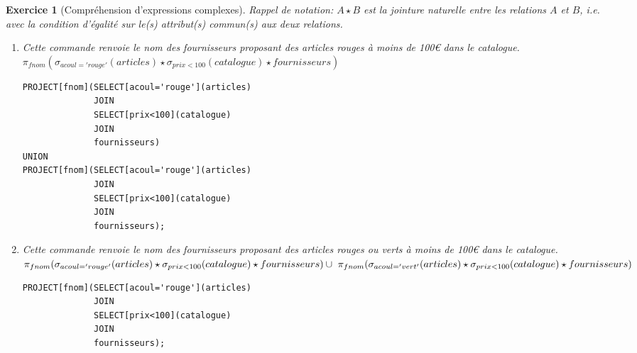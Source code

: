 \documentclass{article}
\theoremstyle{exostyle}
\newtheorem{exercice}{Exercice}
\newenvironment{questions}{

\begin{enumerate}[\hspace{12pt}\bfseries\itshape 1.]}{
\end{enumerate}

} %
\begin{document}
\begin{exercice}[Compréhension d'expressions complexes]
Rappel de notation: $A\star B$ est  la jointure naturelle entre les relations $A$ et $B$, \textit{i.e.} avec la condition d'égalité sur le(s) attribut(s) commun(s) aux deux relations.

\begin{questions}
\item Cette commande renvoie le nom des fournisseurs proposant des articles rouges à moins de 100\euro{} dans le catalogue.\\
$\pi_{fnom}(\sigma_{acoul='rouge'}(articles) \star \sigma_{prix<100}(catalogue) \star fournisseurs)$
\begin{verbatim}
PROJECT[fnom](SELECT[acoul='rouge'](articles)
              JOIN
              SELECT[prix<100](catalogue)
              JOIN
              fournisseurs)
UNION
PROJECT[fnom](SELECT[acoul='rouge'](articles)
              JOIN
              SELECT[prix<100](catalogue)
              JOIN
              fournisseurs);
\end{verbatim}

\item Cette commande renvoie le nom des fournisseurs proposant des articles rouges ou verts à moins de 100\euro{} dans le catalogue.\\
$\pi_{fnom}(\sigma_{acoul='rouge'}(articles) \star \sigma_{prix<100}(catalogue) \star fournisseurs)\newline \cup\ \pi_{fnom}(\sigma_{acoul='vert'}(articles) \star \sigma_{prix<100}(catalogue) \star fournisseurs)$
\begin{verbatim}
PROJECT[fnom](SELECT[acoul='rouge'](articles)
              JOIN
              SELECT[prix<100](catalogue)
              JOIN
              fournisseurs);
\end{verbatim}

\end{questions}

\end{exercice}
\end{document}
